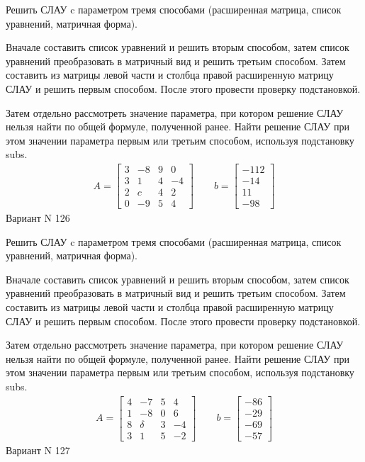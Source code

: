 \documentclass[11pt]{report}
\begin{document}
Решить СЛАУ c параметром тремя способами (расширенная матрица, список уравнений, матричная форма).

Вначале составить список уравнений и решить вторым способом,
затем список уравнений преобразовать в матричный вид и решить третьим способом.
Затем составить из матрицы левой части и столбца правой расширенную матрицу СЛАУ и решить первым способом.
После этого провести проверку подстановкой.

Затем отдельно рассмотреть значение параметра, при котором решение СЛАУ нельзя найти по общей формуле,
полученной ранее.
Найти решение СЛАУ при этом значении параметра первым или третьим способом, используя подстановку subs.
\begin{align*}
    A = \left[\begin{matrix}3 & -8 & 9 & 0\\3 & 1 & 4 & -4\\2 & c & 4 & 2\\0 & -9 & 5 & 4\end{matrix}\right]
\qquad b = \left[\begin{matrix}-112\\-14\\11\\-98\end{matrix}\right]
\end{align*}
\newpage
Вариант N 126


Решить СЛАУ c параметром тремя способами (расширенная матрица, список уравнений, матричная форма).

Вначале составить список уравнений и решить вторым способом,
затем список уравнений преобразовать в матричный вид и решить третьим способом.
Затем составить из матрицы левой части и столбца правой расширенную матрицу СЛАУ и решить первым способом.
После этого провести проверку подстановкой.

Затем отдельно рассмотреть значение параметра, при котором решение СЛАУ нельзя найти по общей формуле,
полученной ранее.
Найти решение СЛАУ при этом значении параметра первым или третьим способом, используя подстановку subs.
\begin{align*}
    A = \left[\begin{matrix}4 & -7 & 5 & 4\\1 & -8 & 0 & 6\\8 & \delta & 3 & -4\\3 & 1 & 5 & -2\end{matrix}\right]
\qquad b = \left[\begin{matrix}-86\\-29\\-69\\-57\end{matrix}\right]
\end{align*}
\newpage
Вариант N 127
\end{document}
